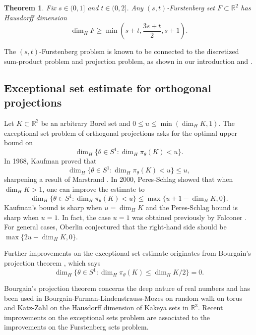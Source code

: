 \documentclass{amsart}
\newtheorem{theorem}[prop]{Theorem}
\newcommand{\R}{\mathbb{R}}
\begin{document}
\begin{theorem}\label{thm: Furstenberg}
    Fix $s \in (0, 1]$ and $t \in (0, 2]$. Any $(s, t)$-Furstenberg set $F \subset \R^2$ has Hausdorff dimension
    \begin{equation*}
        \dim_H F \ge \min(s+t, \frac{3s+t}{2}, s+1).
    \end{equation*}
\end{theorem}

The $(s,t)$-Furstenberg problem  is known to be connected to the discretized sum-product problem and projection problem, as shown in our introduction and \cite[Section 6]{orponen2023projections}.  

\subsection{Exceptional set estimate for orthogonal projections}
 Let $K \subset \R^2$ be an arbitrary Borel set and $0 \le u \le \min (\dim_H K, 1)$. The exceptional set problem of orthogonal projections asks for the optimal upper bound on 
\[
 \dim_H \{ \theta \in S^1 : \dim_H \pi_\theta (K) < u \}.
\]
In 1968, 
Kaufman \cite{kaufman1968hausdorff} proved that 
\[
  \dim_H \{ \theta \in S^1 : \dim_H \pi_\theta (K) < u \} \le u, 
\]
sharpening a result of Marstrand \cite{marstrand1954some}. 
In 2000,  Peres-Schlag \cite{peres2000smoothness} showed  that when $\dim_H K >1 $, one can improve the estimate to 
\[\dim_H \{ \theta \in S^1 : \dim_H \pi_\theta (K) < u \} \le \max\{ u +1-\dim_H K , 0\}.\]
Kaufman's bound is sharp when $u=\dim_H K$ and the Peres-Schlag bound is sharp when $u=1$. In fact, the case $u=1$ was obtained previously by Falconer \cite{falconer1982hausdorff}.   For general cases, Oberlin \cite{oberlin2012restricted} conjectured that the right-hand side should be $ \max\{ 2u - \dim_H K, 0 \}.$


Further improvements on the exceptional set estimate originates from Bourgain's projection theorem \cite{bourgain2010discretized},  which says
\begin{equation}\label{eq: Bourgainproj}
  \dim_H \{ \theta \in S^1 : \dim_H \pi_\theta (K) \leq \dim_H K/2 \}=0. 
\end{equation}

Bourgain's projection theorem concerns the deep nature of real numbers and has been used in Bourgain-Furman-Lindenstrauss-Mozes \cite{bourgain2011stationary} on random walk on torus  and Katz-Zahl \cite{katz2019improved} on the Hausdorff dimension of Kakeya sets in $\mathbb{R}^3$. Recent improvements  \cite{orponen2021hausdorff, orponen2023projections} on the exceptional sets problem are associated to the improvements on the Furstenberg sets problem.  
\end{document}
